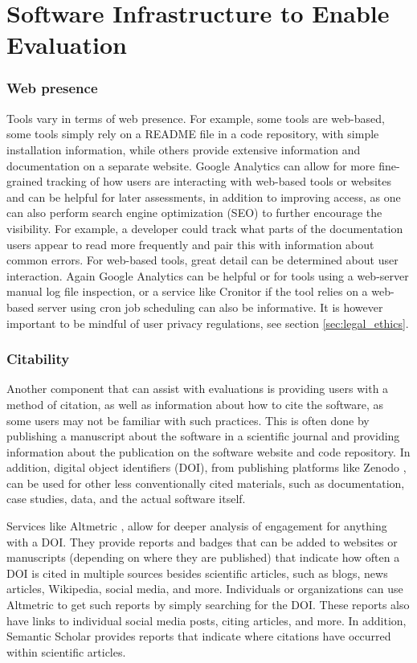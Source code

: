 \section{Software Infrastructure to Enable Evaluation}

\subsubsection{Web presence}
Tools vary in terms of web presence. For example, some tools are web-based, some tools simply rely on a README file in a code repository, with simple installation information, while others provide extensive information and documentation on a separate website. Google Analytics can allow for more fine-grained tracking of how users are interacting with web-based tools or websites and can be helpful for later assessments, in addition to improving access, as one can also perform search engine optimization (SEO) to further encourage the visibility. For example, a developer could track what parts of the documentation users appear to read more frequently and pair this with information about common errors. For web-based tools, great detail can be determined about user interaction. Again Google Analytics can be helpful or for tools using a web-server manual log file inspection, or a service like Cronitor \cite{cronitor}  if the tool relies on a web-based server using cron \cite{cron_2009} job scheduling can also be informative.  It is however important to be mindful of user privacy regulations, see section \ref{sec:legal_ethics}.

\subsubsection{Citability}
Another component that can assist with evaluations is providing users with a method of citation, as well as information about how to cite the software, as some users may not be familiar with such practices. This is often done by publishing a manuscript about the software in a scientific journal and providing information about the publication on the software website and code repository. In addition, digital object identifiers (DOI), from publishing platforms like Zenodo \cite{zenodo}, can be used for other less conventionally cited materials, such as documentation, case studies, data, and the actual software itself.

Services like Altmetric \cite{noauthor_altmetric_2015}, allow for deeper analysis of engagement for anything with a DOI. They provide reports and badges that can be added to websites or manuscripts (depending on where they are published) that indicate how often a DOI is cited in multiple sources besides scientific articles, such as blogs, news articles, Wikipedia, social media, and more.  Individuals or organizations can use Altmetric to get such reports by simply searching for the DOI. These reports also have links to individual social media posts, citing articles, and more. In addition, Semantic Scholar  \cite{noauthor_semantic_nodate} provides reports that indicate where citations have occurred within scientific articles. 


